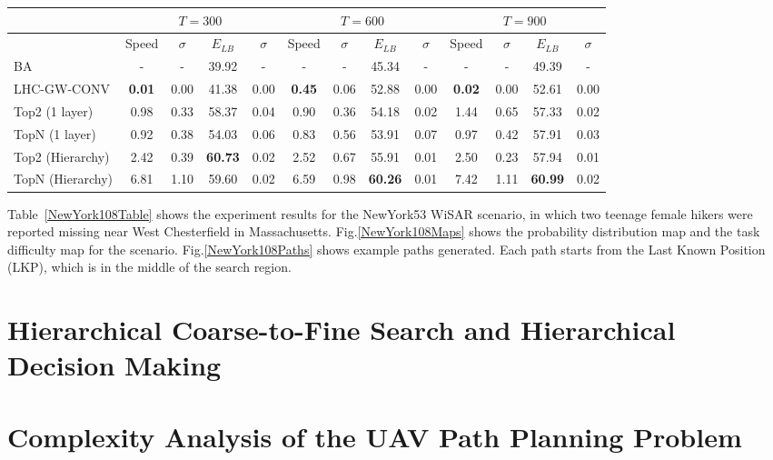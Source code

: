 \begin{center}
\begin{table*}
{
\scriptsize
\hfill{}
\setlength{\extrarowheight}{1.5pt}
\begin{tabular}
{|l|c|c|c|c|c|c|c|c|c|c|c|c|}
\hline
& \multicolumn{4}{|c|}{$T=300$} & \multicolumn{4}{|c|}{$T=600$} & \multicolumn{4}{|c|}{$T=900$} \\ 
\hline
& Speed & $\sigma$ & $\mathit{E_{LB}}$ & $\sigma$ & Speed & $\sigma$ & $\mathit{E_{LB}}$ & $\sigma$ & Speed & $\sigma$ & $\mathit{E_{LB}}$ & $\sigma$\\ 
\hline
BA & - & - & 39.92 & - & - & - & 45.34 & - & - & - & 49.39 & -\\ 
\hline
LHC-GW-CONV & \textbf{0.01} & 0.00 & 41.38 & 0.00 & \textbf{0.45} & 0.06 & 52.88 & 0.00 & \textbf{0.02} & 0.00 & 52.61 & 0.00\\ 
\hline
Top2 (1 layer) & 0.98 & 0.33 & 58.37 & 0.04 & 0.90 & 0.36 & 54.18 & 0.02 & 1.44 & 0.65 & 57.33 & 0.02\\ 
\hline
TopN (1 layer) & 0.92 & 0.38 & 54.03 & 0.06 & 0.83 & 0.56 & 53.91 & 0.07 & 0.97 & 0.42 & 57.91 & 0.03\\ 
\hline
Top2 (Hierarchy) & 2.42 & 0.39 & \textbf{60.73} & 0.02 & 2.52 & 0.67 & 55.91 & 0.01 & 2.50 & 0.23 & 57.94 & 0.01\\ 
\hline
TopN (Hierarchy) & 6.81 & 1.10 & 59.60 & 0.02 & 6.59 & 0.98 & \textbf{60.26} & 0.01 & 7.42 & 1.11 & \textbf{60.99} & 0.02\\ 
\hline
\end{tabular}}
\medskip
\caption{Algorithms speed and $\mathit{Efficiency_{LB}}$ comparison for the NewYork108 scenario.}
\label{NewYork108Table}
\end{table*}
\end{center}
Table~\ref{NewYork108Table} shows the experiment results for the NewYork53 WiSAR scenario, in which two teenage female hikers were reported missing near West Chesterfield in Massachusetts. Fig.\ref{NewYork108Maps} shows the probability distribution map and the task difficulty map for the scenario. Fig.\ref{NewYork108Paths} shows example paths generated. Each path starts from the Last Known Position (LKP), which is in the middle of the search region.

\chapter{Hierarchical Coarse-to-Fine Search and Hierarchical Decision Making}
\label{chap:hierarchical}

\chapter{Complexity Analysis of the UAV Path Planning Problem}
\label{chap:complexity}


